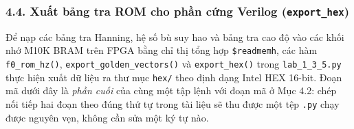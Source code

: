 \documentclass[11pt,a4paper]{article}
\begin{document}
\subsubsection*{4.4. Xuất bảng tra ROM cho phần cứng Verilog (\texttt{export\_hex})}

Để nạp các bảng tra Hanning, hệ số bù suy hao và bảng tra cao độ vào các khối nhớ M10K BRAM trên FPGA bằng chỉ thị tổng hợp \texttt{\$readmemh}, các hàm \texttt{f0\_rom\_hz()}, \texttt{export\_golden\_vectors()} và \texttt{export\_hex()} trong \texttt{lab\_1\_3\_5.py} thực hiện xuất dữ liệu ra thư mục \texttt{hex/} theo định dạng Intel HEX 16-bit. Đoạn mã dưới đây là \emph{phần cuối} của cùng một tập lệnh với đoạn mã ở Mục 4.2: chép nối tiếp hai đoạn theo đúng thứ tự trong tài liệu sẽ thu được một tệp \texttt{.py} chạy được nguyên vẹn, không cần sửa một ký tự nào.
\end{document}
